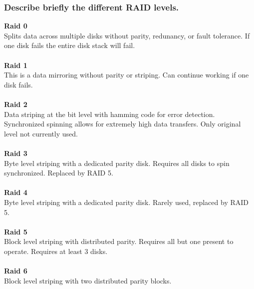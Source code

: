 \documentclass{article}
\begin{document}
\subsubsection*{Describe briefly the different RAID levels.}
\textbf{Raid 0}\\
Splits data across multiple disks without parity, redunancy, or fault tolerance. If one disk fails the entire disk stack will fail.\\\\
\textbf{Raid 1}\\
This is a data mirroring without parity or striping. Can continue working if one disk fails. \\\\
\textbf{Raid 2}\\
Data striping at the bit level with hamming code for error detection. Synchronized spinning allows for extremely high data transfers. Only original level not currently used.\\\\
\textbf{Raid 3}\\
Byte level striping with a dedicated parity disk. Requires all disks to spin synchronized. Replaced by RAID 5.\\\\
\textbf{Raid 4}\\
Byte level striping with a dedicated parity disk. Rarely used, replaced by RAID 5.\\\\
\textbf{Raid 5}\\
Block level striping with distributed parity. Requires all but one present to operate. Requires at least 3 disks.\\\\
\textbf{Raid 6}\\
Block level striping with two distributed parity blocks.\\
\end{document}
